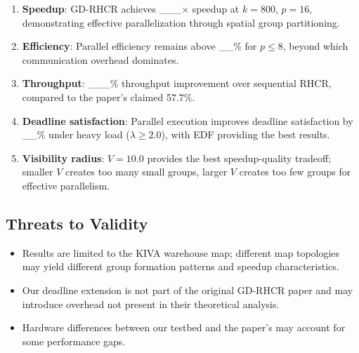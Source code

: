 \begin{enumerate}
    \item \textbf{Speedup}: GD-RHCR achieves \_\_\_$\times$ speedup at $k=800$,
          $p=16$, demonstrating effective parallelization through spatial
          group partitioning.
    \item \textbf{Efficiency}: Parallel efficiency remains above \_\_\% for
          $p \leq 8$, beyond which communication overhead dominates.
    \item \textbf{Throughput}: \_\_\_\% throughput improvement over sequential
          RHCR, compared to the paper's claimed 57.7\%.
    \item \textbf{Deadline satisfaction}: Parallel execution improves deadline
          satisfaction by \_\_\% under heavy load ($\lambda \geq 2.0$), with
          EDF providing the best results.
    \item \textbf{Visibility radius}: $V=10.0$ provides the best speedup-quality
          tradeoff; smaller $V$ creates too many small groups, larger $V$ creates
          too few groups for effective parallelism.
\end{enumerate}

\subsection{Threats to Validity}
\begin{itemize}
    \item Results are limited to the KIVA warehouse map; different map topologies
          may yield different group formation patterns and speedup characteristics.
    \item Our deadline extension is not part of the original GD-RHCR paper and
          may introduce overhead not present in their theoretical analysis.
    \item Hardware differences between our testbed and the paper's may account
          for some performance gaps.
\end{itemize}
